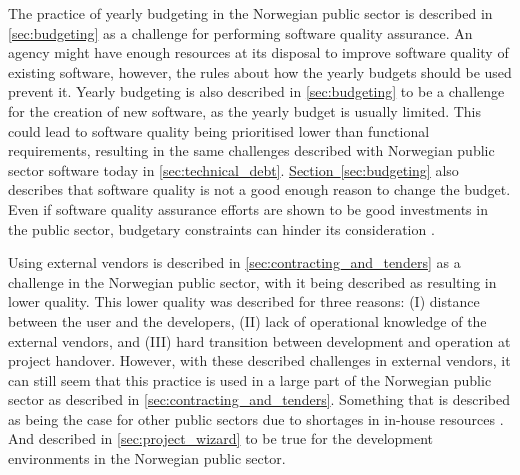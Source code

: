 The practice of yearly budgeting in the Norwegian public sector is described in \autoref{sec:budgeting} as a challenge for performing software quality assurance. An agency might have enough resources at its disposal to improve software quality of existing software, however, the rules about how the yearly budgets should be used prevent it. Yearly budgeting is also described in \autoref{sec:budgeting} to be a challenge for the creation of new software, as the yearly budget is usually limited. This could lead to software quality being prioritised lower than functional requirements, resulting in the same challenges described with Norwegian public sector software today in \autoref{sec:technical_debt}. \hyperref[sec:budgeting]{Section~\ref*{sec:budgeting}} also describes that software quality is not a good enough reason to change the budget. Even if software quality assurance efforts are shown to be good investments in the public sector, budgetary constraints can hinder its consideration \cite{jc_2010}.  


Using external vendors is described in \autoref{sec:contracting_and_tenders} as a challenge in the Norwegian public sector, with it being described as resulting in lower quality. This lower quality was described for three reasons: (I) distance between the user and the developers, (II) lack of operational knowledge of the external vendors, and (III) hard transition between development and operation at project handover. However, with these described challenges in external vendors, it can still seem that this practice is used in a large part of the Norwegian public sector as described in \autoref{sec:contracting_and_tenders}. Something that is described as being the case for other public sectors due to shortages in in-house resources \cite{jc_2010}. And described in \autoref{sec:project_wizard} to be true for the development environments in the Norwegian public sector.

